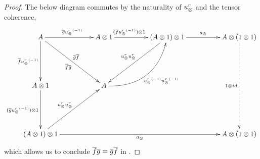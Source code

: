 \begin{proof}

      The below diagram commutes by the naturality of $u_{\otimes}^r$ and the tensor coherence,
      \[
        \xymatrix @C=48pt @R=55pt{
          A \ar[r]^{\restr{g} \inv{\usr}}
            \ar[dr]_{\restr{f}\restr{g}}^{\restr{g}\restr{f}}
            \ar[d]_{\restr{f}\inv{\usr}}
            &A\*1 \ar[r]^(.4){(\rst{f}\inv{\usr})\*1}
            & (A \*1) \* 1
            \ar[r]^{a_{\*}}  \ar[dl]_{\usr \usr}
            & A \* (1\*1) \ar@{.>}[dd]_{1\*id}\\ %
          A\*1 \ar[d]_{(\rst{g}\inv{\usr})\*1}
            &A \ar@/_25pt/[ur]_{\inv{\usr}\inv{\usr}} \\
          (A\*1)\*1 \ar[rrr]_{a_\*} \ar[ur]^{\usr \usr}
            &&& A \* (1\*1)
        }
      \]
      which allows us to conclude $\overline{f} \overline{g} = \overline{g} \overline{f}$ in \Xt.


\end{proof}
